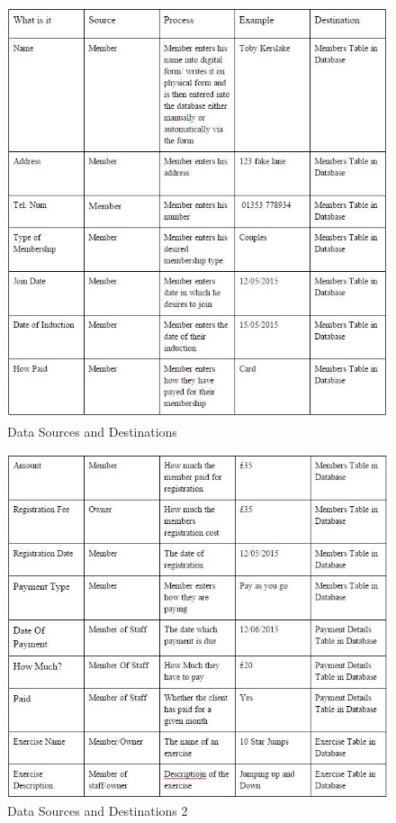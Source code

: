 \begin{figure}[H]
    \includegraphics[width=\textwidth]{Data Sources and Definitions - Proposed 2.JPG}
    \caption{Data Sources and Destinations} \label{fig: Data Sources and Destinations }
\end{figure}

\begin{figure}[H]
    \includegraphics[width=\textwidth]{Data Sources and Definitions - Proposed.JPG}
    \caption{Data Sources and Destinations 2} \label{fig: Data Sources and Destinations 2 }
\end{figure}

